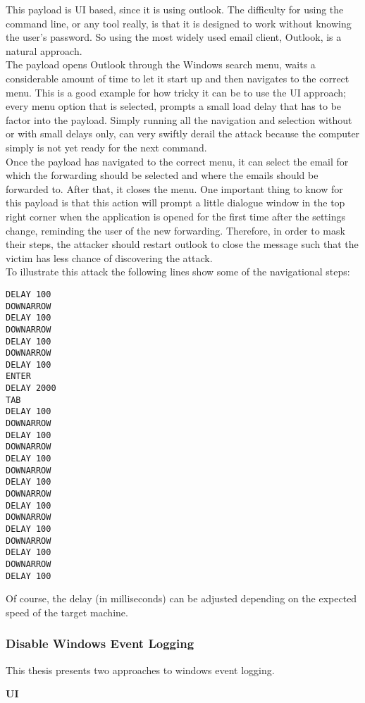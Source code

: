 This payload is UI based, since it is using outlook. The difficulty for using the command line, or any tool really, is that it is designed to work without knowing the user's password. So using the most widely used email client, Outlook, is a natural approach. \\
The payload opens Outlook through the Windows search menu, waits a considerable amount of time to let it start up and then navigates to the correct menu. This is a good example for how tricky it can be to use the UI approach; every menu option that is selected, prompts a small load delay that has to be factor into the payload. Simply running all the navigation and selection without or with small delays only, can very swiftly derail the attack because the computer simply is not yet ready for the next command. \\
Once the payload has navigated to the correct menu, it can select the email for which the forwarding should be selected and where the emails should be forwarded to. After that, it closes the menu. One important thing to know for this payload is that this action will prompt a little dialogue window in the top right corner when the application is opened for the first time after the settings change, reminding the user of the new forwarding. Therefore, in order to mask their steps, the attacker should restart outlook to close the message such that the victim has less chance of discovering the attack. \\
To illustrate this attack the following lines show some of the navigational steps:


\begin{lstlisting}
DELAY 100
DOWNARROW
DELAY 100
DOWNARROW
DELAY 100
DOWNARROW
DELAY 100
ENTER
DELAY 2000
TAB
DELAY 100
DOWNARROW
DELAY 100
DOWNARROW
DELAY 100
DOWNARROW
DELAY 100
DOWNARROW
DELAY 100
DOWNARROW
DELAY 100
DOWNARROW
DELAY 100
DOWNARROW
DELAY 100
\end{lstlisting}

Of course, the delay (in milliseconds) can be adjusted depending on the expected speed of the target machine. 




\subsubsection{Disable Windows Event Logging}

This thesis presents two approaches to windows event logging.

\textbf{UI} 

